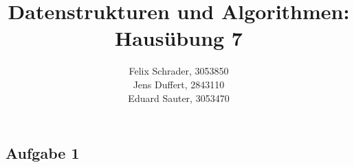 \documentclass[11pt]{article}
\author{
  Felix Schrader, 3053850 \\ 
  Jens Duffert, 2843110 \\
  Eduard Sauter, 3053470
}
\title{Datenstrukturen und Algorithmen: Haus\"ubung 7}
\begin{document}
\maketitle
\subsection*{Aufgabe 1}
  
\end{document}
